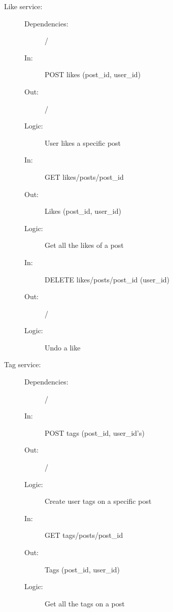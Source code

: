 \documentclass{article}
\begin{document}
\begin{description}
    \item [Like service:]
    \begin{description}
        \item[]
        \item[Dependencies:] /
    \end{description}
    \begin{description}
        \item[]
        \item[In:] POST likes (post\_id, user\_id)
        \item[Out:] /
        \item[Logic:] User likes a specific post
        \item[]

        \item[In:] GET likes/posts/post\_id
        \item[Out:] Likes (post\_id, user\_id)
        \item[Logic:] Get all the likes of a post
        \item[]
        
        \item[In:] DELETE likes/posts/post\_id (user\_id)
        \item[Out:] /
        \item[Logic:] Undo a like
        \item[]
    \end{description}
\end{description}

\begin{description}
    \item [Tag service:]
    \begin{description}
        \item[]
        \item[Dependencies:] /
    \end{description}
    \begin{description}
        \item[]
        \item[In:] POST tags (post\_id, user\_id's)
        \item[Out:] /
        \item[Logic:] Create user tags on a specific post
        \item[]

        \item[In:] GET tags/posts/post\_id
        \item[Out:] Tags (post\_id, user\_id)
        \item[Logic:] Get all the tags on a post
        \item[]
    \end{description}
\end{description}
\end{document}
